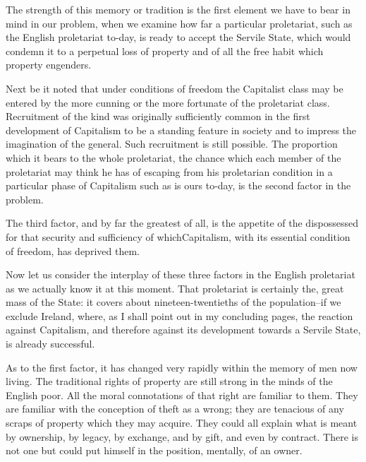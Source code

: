 \documentclass{book}
\begin{document}
The strength of this memory or tradition is the first element we have to bear in mind in our problem, when we examine how far a particular proletariat, such as the English proletariat to-day, is ready to accept the Servile State, which would condemn it to a perpetual loss of property and of all the free habit which property engenders.

Next be it noted that under conditions of freedom the Capitalist class may be entered by the more cunning or the more fortunate of the proletariat class. Recruitment of the kind was originally sufficiently common in the first development of Capitalism to be a standing feature in society and to impress the imagination of the general. Such recruitment is still possible. The proportion which it bears to the whole proletariat, the chance which each member of the proletariat may think he has of escaping from his proletarian condition in a particular phase of Capitalism such as is ours to-day, is the second factor in the problem.

The third factor, and by far the greatest of all, is the appetite of the dispossessed for that security and sufficiency of whichCapitalism, with its essential condition of freedom, has deprived them.

Now let us consider the interplay of these three factors in the English proletariat as we actually know it at this moment. That proletariat is certainly the, great mass of the State: it covers about nineteen-twentieths of the population–if we exclude Ireland, where, as I shall point out in my concluding pages, the reaction against Capitalism, and therefore against its development towards a Servile State, is already successful.

As to the first factor, it has changed very rapidly within the memory of men now living. The traditional rights of property are still strong in the minds of the English poor. All the moral connotations of that right are familiar to them. They are familiar with the conception of theft as a wrong; they are tenacious of any scraps of property which they may acquire. They could all explain what is meant by ownership, by legacy, by exchange, and by gift, and even by contract. There is not one but could put himself in the position, mentally, of an owner.
\end{document}
